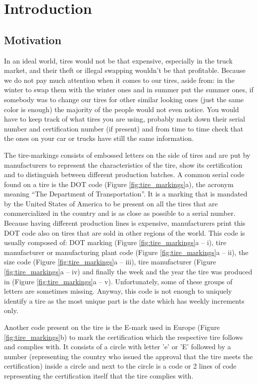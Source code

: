 \chapter{Introduction}\pagestyle{fancy}\setlength{\parindent}{3em}
\label{chap:intro}

\section{Motivation}
\label{sec:motivation}

In an ideal world, tires would not be that expensive, especially in the truck market, and their theft or illegal swapping wouldn't be that profitable. Because we do not pay much attention when it comes to our tires, aside from: in the winter to swap them with the winter ones and in summer put the summer ones, if somebody was to change our tires for other similar looking ones (just the same color is enough) the majority of the people would not even notice. You would have to keep track of what tires you are using, probably mark down their serial number and certification number (if present) and from time to time check that the ones on your car or trucks have still the same information.

The tire-markings consists of embossed letters on the side of tires and are put by manufacturers to represent the characteristics of the tire, show its certification and to distinguish between different production batches. A common serial code found on a tire is the DOT code (Figure \ref{fig:tire_markings}a), the acronym meaning “The Department of Transportation”. It is a marking that is mandated by the United States of America to be present on all the tires that are commercialized in the country and is as close as possible to a serial number. Because having different production lines is expensive, manufacturers print this DOT code also on tires that are sold in other regions of the world. This code is usually composed of: DOT marking (Figure \ref{fig:tire_markings}a -- i), tire manufacturer or manufacturing plant code (Figure \ref{fig:tire_markings}a -- ii), the size code (Figure \ref{fig:tire_markings}a -- iii), tire manufacturer (Figure \ref{fig:tire_markings}a -- iv) and finally the week and the year the tire was produced in (Figure \ref{fig:tire_markings}a -- v). Unfortunately, some of these groups of letters are sometimes missing. Anyway, this code is not enough to uniquely identify a tire as the most unique part is the date which has weekly increments only.

Another code present on the tire is the E-mark used in Europe (Figure \ref{fig:tire_markings}b) to mark the certification which the respective tire follows and complies with. It consists of a circle with letter 'e' or 'E' followed by a number (representing the country who issued the approval that the tire meets the certification) inside a circle and next to the circle is a code or 2 lines of code representing the certification itself that the tire complies with.

